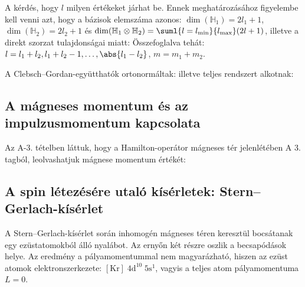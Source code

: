    A kérdés, hogy $l$ milyen értékeket járhat be.
   Ennek meghatározásához figyelembe kell venni azt, hogy a bázisok elemszáma azonos: $\dim(\mathbb{H}_1)=2l_1+1$, $\dim(\mathbb{H}_2)=2l_2+1$ és $\dim(\mathbb{H}_1\otimes\mathbb{H}_2)=\suml{l=l_\text{min}}{l_\text{max}}(2l+1)$, illetve a direkt szorzat tulajdonságai miatt:
   Összefoglalva tehát: $l=l_1+l_2,l_1+l_2-1,\dots,\abs{l_1-l_2}$, $m=m_1+m_2$. 
   
   A Clebsch--Gordan-együtthatók ortonormáltak:
   illetve teljes rendszert alkotnak:
   
  \subsection{A mágneses momentum és az impulzusmomentum kapcsolata}
   
   Az A-3. tételben láttuk, hogy a Hamilton-operátor mágneses tér jelenlétében
   A 3. tagból, leolvashatjuk mágnese momentum értékét:
   
  \subsection{A spin létezésére utaló kísérletek: Stern--Gerlach-kísérlet}
   
   A Stern--Gerlach-kísérlet során inhomogén mágneses téren keresztül bocsátanak egy ezüstatomokból álló nyalábot.
   Az ernyőn két részre oszlik a becsapódások helye.
   Az eredmény a pályamomentummal nem magyarázható, hiszen az ezüst atomok elektronszerkezete: $[\text{Kr}]\;4\text{d}^{10}\;5\text{s}^1$, vagyis a teljes atom pályamomentuma $L=0$. 
   
